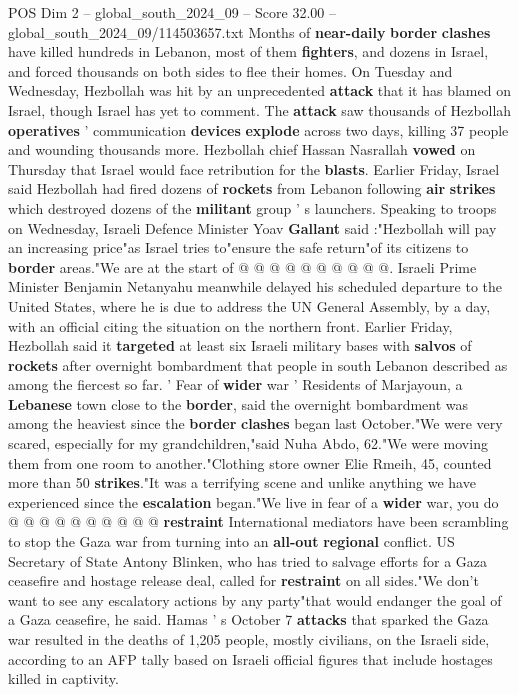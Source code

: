 \begin{textsample}{POS Dim 2 – global\_south\_2024\_09 – Score 32.00 – global\_south\_2024\_09/114503657.txt}
Months of \textbf{near-daily} \textbf{border} \textbf{clashes} have killed hundreds in Lebanon, most of them \textbf{fighters}, and dozens in Israel, and forced thousands on both sides to flee their homes.
On Tuesday and Wednesday, Hezbollah was hit by an unprecedented \textbf{attack} that it has blamed on Israel, though Israel has yet to comment.
The \textbf{attack} saw thousands of Hezbollah \textbf{operatives} ' communication \textbf{devices} \textbf{explode} across two days, killing 37 people and wounding thousands more.
Hezbollah chief Hassan Nasrallah \textbf{vowed} on Thursday that Israel would face retribution for the \textbf{blasts}.
Earlier Friday, Israel said Hezbollah had fired dozens of \textbf{rockets} from Lebanon following \textbf{air} \textbf{strikes} which destroyed dozens of the \textbf{militant} group ' s launchers.
Speaking to troops on Wednesday, Israeli Defence Minister Yoav \textbf{Gallant} said :"Hezbollah will pay an increasing price"as Israel tries to"ensure the safe return"of its citizens to \textbf{border} areas."We are at the start of @ @ @ @ @ @ @ @ @ @.
Israeli Prime Minister Benjamin Netanyahu meanwhile delayed his scheduled departure to the United States, where he is due to address the UN General Assembly, by a day, with an official citing the situation on the northern front.
Earlier Friday, Hezbollah said it \textbf{targeted} at least six Israeli military bases with \textbf{salvos} of \textbf{rockets} after overnight bombardment that people in south Lebanon described as among the fiercest so far. ' Fear of \textbf{wider} war ' Residents of Marjayoun, a \textbf{Lebanese} town close to the \textbf{border}, said the overnight bombardment was among the heaviest since the \textbf{border} \textbf{clashes} began last October."We were very scared, especially for my grandchildren,"said Nuha Abdo, 62."We were moving them from one room to another."Clothing store owner Elie Rmeih, 45, counted more than 50 \textbf{strikes}."It was a terrifying scene and unlike anything we have experienced since the \textbf{escalation} began."We live in fear of a \textbf{wider} war, you do @ @ @ @ @ @ @ @ @ @ \textbf{restraint} International mediators have been scrambling to stop the Gaza war from turning into an \textbf{all-out} \textbf{regional} conflict.
US Secretary of State Antony Blinken, who has tried to salvage efforts for a Gaza ceasefire and hostage release deal, called for \textbf{restraint} on all sides."We don't want to see any escalatory actions by any party"that would endanger the goal of a Gaza ceasefire, he said.
Hamas ' s October 7 \textbf{attacks} that sparked the Gaza war resulted in the deaths of 1,205 people, mostly civilians, on the Israeli side, according to an AFP tally based on Israeli official figures that include hostages killed in captivity.

\end{textsample}
